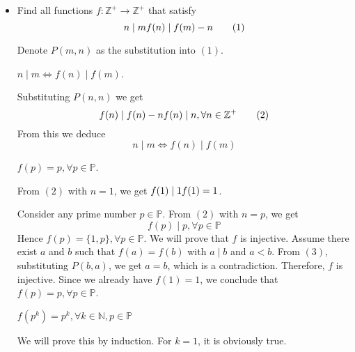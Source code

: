 \documentclass[11pt]{scrartcl}
\begin{document}
\begin{itemize}[label=, leftmargin=0em, itemsep=0.2em]
\begin{sol}
        Let $|y_{1}|=|y_{2}|$ be two complex numbers. Then using injectivity of $f$ we get
        $P(x,y_{1}), P(x,y_{2}) \implies y_{1}f(y_{1}) = y_{2}f(y_{2})$. Let $y_{1} =y$ and $y_{2} = |y|$ we get that
        $$f(y) = \dfrac{\bar{y}}{|y|}f(|y|)\; \;\;\;(1).$$
        So it suffices to find $f$ on the real line $\mathbb{R}$. By applying $f()$ both sides of $P(x,y)$ we get $f(x+|y|^2)=f(x)+yf(y)$. By inserting $x=0$ in this equation and rewriting the equation we get
        $f(x+|y|^{2})=f(x)+f(|y|^{2})$. Then for any two positive real numbers $x,y$ we have
        $$f(x+y)=f(x)+f(y) .$$We know that $|f(x)|=|x|$ for any complex number $x$. Using triangle inequality, for positive reals $a,b$ we have
        $$a+b = |a+b| = |f(a+b)| = |f(a)+f(b)| \leq |f(a)| +  |f(b)| = |a| + |b| = a+b.$$The equality case of triangle inequality gives us that $f(x)=xf(1)$ for all positive real $x$. So $f(|x|)= |x|f(1)$ for any $x\in \mathbb{C}$. This with $(1)$ gives us
        $$\forall y\in \mathbb{C}:\;f(y) = f(1)\cdot \bar{y}.$$And so $\boxed{f(y)=e^{i\theta}\overline y\quad\forall y\in\mathbb C}$, which indeed fits, whatever is $\theta\in[0,2\pi)$.
    \end{sol}
    \item \begin{bt}
        Find all functions $f: \mathbb{Z^+} \to \mathbb{Z^+}$ that satisfy
        \[
             n\mid m \lra f(n) \mid f(m) - n \tag{1}
        \]
    \end{bt}
    \begin{sol}
        Denote $P(m,n)$ as the substitution into $(1)$. 
        
         $n \mid m \iff f(n) \mid f(m)$.
        \begin{pro}
            Substituting $P(n,n)$ we get 
                \[f(n) \mid f(n) - n \ra f(n) \mid n, \forall n \in \mathbb{Z^+} \tag{2}
                \]
                From this we deduce 
                \[
                n \mid m \iff f(n) \mid f(m) \tag{3}
                \] 
        \end{pro}
         $f(p) = p, \forall p \in \mathbb{P}$.
        \begin{pro}
            From $(2)$ with $n = 1$, we get $f(1) \mid 1 \ra f(1) = 1$. 
        
        Consider any prime number $p \in \mathbb{P}$. From $(2)$ with $n = p$, we get 
        \[
            f(p) \mid p, \forall p \in \mathbb{P}
        \]
        Hence $f(p) = \{1, p\}, \forall p \in \mathbb{P}$. We will prove that $f$ is injective. Assume there exist $a$ and $b$ such that $f(a) = f(b)$ with $a \mid b$ and $a < b$. From $(3)$, substituting $P(b,a)$, we get $a = b$, which is a contradiction. Therefore, $f$ is injective. Since we already have $f(1) = 1$, we conclude that $f(p) = p, \forall p \in \mathbb{P}$.
        \end{pro}
         $f(p^k) = p^k, \forall k \in \mathbb{N}, p \in \mathbb{P}$
        \begin{pro}
            We will prove this by induction. For $k = 1$, it is obviously true.
            

\end{pro}
\end{sol}
\end{itemize}
\end{document}
